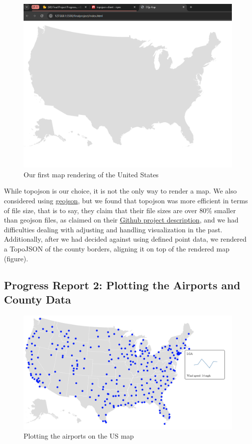 \documentclass[9pt,twocolumn,twoside]{opticajnl}
\begin{document}
\begin{figure}
    \centering
    \includegraphics[scale=0.25]{images/img1.png}
    \caption{Our first map rendering of the United States}
\end{figure}

While topojson is our choice, it is not the only way to render a map. We also considered using \href{https://geojson.org/}{geojson}, but we found that topojson was more efficient in terms of file size, that is to say, they claim that their file sizes are over 80\% smaller than geojson files, as claimed on their \href{https://github.com/topojson/topojson}{Github project description}, and we had difficulties dealing with adjusting and handling visualization in the past. Additionally, after we had decided against using defined point data, we rendered a TopoJSON of the county borders, aligning it on top of the rendered map (figure).

\subsection{Progress Report 2: Plotting the Airports and County Data}

\begin{figure}
    \centering
    \includegraphics[scale=0.25]{images/img2.png}
    \caption{Plotting the airports on the US map}
\end{figure}
\end{document}
